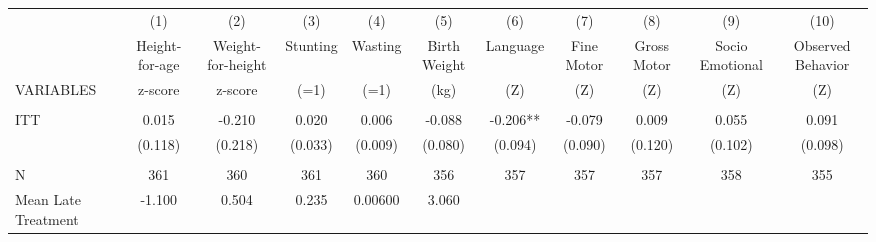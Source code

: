 \begin{tabular}{lcccccccccc} \hline
 & (1) & (2) & (3) & (4) & (5) & (6) & (7) & (8) & (9) & (10) \\
 & Height-for-age & Weight-for-height & Stunting & Wasting & Birth Weight & Language & Fine Motor & Gross Motor & Socio Emotional & Observed Behavior \\
VARIABLES & z-score & z-score & (=1) & (=1) & (kg) & (Z) & (Z) & (Z) & (Z) & (Z) \\ \hline
 &  &  &  &  &  &  &  &  &  &  \\
ITT & 0.015 & -0.210 & 0.020 & 0.006 & -0.088 & -0.206** & -0.079 & 0.009 & 0.055 & 0.091 \\
 & (0.118) & (0.218) & (0.033) & (0.009) & (0.080) & (0.094) & (0.090) & (0.120) & (0.102) & (0.098) \\
 &  &  &  &  &  &  &  &  &  &  \\
N & 361 & 360 & 361 & 360 & 356 & 357 & 357 & 357 & 358 & 355 \\
 Mean Late Treatment & -1.100 & 0.504 & 0.235 & 0.00600 & 3.060 &  &  &  &  &  \\ \hline
\end{tabular}
